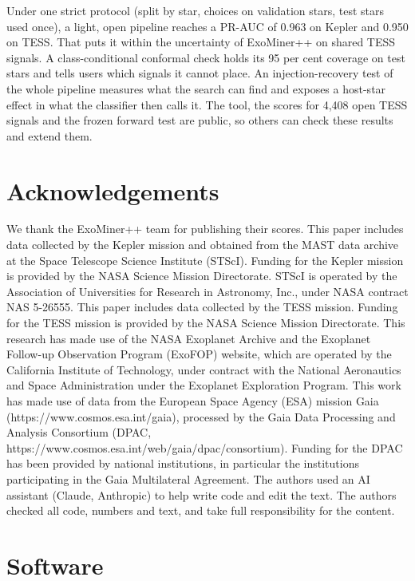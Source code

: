 \documentclass[
]{article}
\begin{document}
Under one strict protocol (split by star, choices on validation stars,
test stars used once), a light, open pipeline reaches a PR-AUC of 0.963
on Kepler and 0.950 on TESS. That puts it within the uncertainty of
ExoMiner++ on shared TESS signals. A class-conditional conformal check
holds its 95 per cent coverage on test stars and tells users which
signals it cannot place. An injection-recovery test of the whole
pipeline measures what the search can find and exposes a host-star
effect in what the classifier then calls it. The tool, the scores for
4,408 open TESS signals and the frozen forward test are public, so
others can check these results and extend them.

\hypertarget{acknowledgements}{%
\section{Acknowledgements}\label{acknowledgements}}

We thank the ExoMiner++ team for publishing their scores. This paper
includes data collected by the Kepler mission and obtained from the MAST
data archive at the Space Telescope Science Institute (STScI). Funding
for the Kepler mission is provided by the NASA Science Mission
Directorate. STScI is operated by the Association of Universities for
Research in Astronomy, Inc., under NASA contract NAS 5-26555. This paper
includes data collected by the TESS mission. Funding for the TESS
mission is provided by the NASA Science Mission Directorate. This
research has made use of the NASA Exoplanet Archive and the Exoplanet
Follow-up Observation Program (ExoFOP) website, which are operated by
the California Institute of Technology, under contract with the National
Aeronautics and Space Administration under the Exoplanet Exploration
Program. This work has made use of data from the European Space Agency
(ESA) mission Gaia (https://www.cosmos.esa.int/gaia), processed by the
Gaia Data Processing and Analysis Consortium (DPAC,
https://www.cosmos.esa.int/web/gaia/dpac/consortium). Funding for the
DPAC has been provided by national institutions, in particular the
institutions participating in the Gaia Multilateral Agreement. The
authors used an AI assistant (Claude, Anthropic) to help write code and
edit the text. The authors checked all code, numbers and text, and take
full responsibility for the content.

\hypertarget{software}{%
\section{Software}\label{software}}
\end{document}
